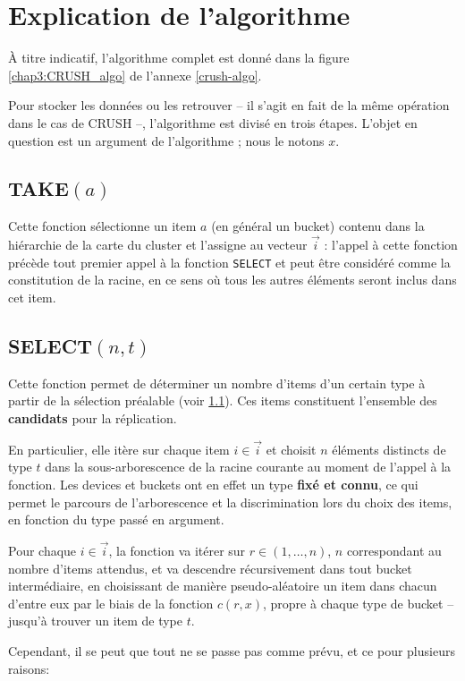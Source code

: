 \section{Explication de l'algorithme}

À titre indicatif, l'algorithme complet est donné dans la figure \ref{chap3:CRUSH_algo} de l'annexe \ref{crush-algo}.

Pour stocker les données ou les retrouver -- il s'agit en fait de la même opération dans le cas de CRUSH --, l'algorithme est divisé en trois étapes. L'objet en question est un argument de l'algorithme ; nous le notons $x$.

\subsection{TAKE$(a)$}\label{chap3:take}
Cette fonction sélectionne un item $a$ (en général un bucket) contenu dans la hiérarchie de la carte du cluster et l'assigne au vecteur $\vec{i}$ : l'appel à cette fonction précède tout premier appel à la fonction \verb|SELECT| et peut être considéré comme la constitution de la racine, en ce sens où tous les autres éléments seront inclus dans cet item.

\subsection{SELECT$(n,t)$}
Cette fonction permet de déterminer un nombre d'items d'un certain type à partir de la sélection préalable (voir \ref{chap3:take}). Ces items constituent l'ensemble des \textbf{candidats} pour la réplication.

En particulier, elle itère sur chaque item $i \in \vec{i}$ et choisit $n$ éléments distincts de type $t$ dans la sous-arborescence de la racine courante au moment de l'appel à la fonction. Les devices et buckets ont en effet un type \textbf{fixé et connu}, ce qui permet le parcours de l'arborescence et la discrimination lors du choix des items, en fonction du type passé en argument.

Pour chaque $i \in \vec{i}$, la fonction va itérer sur $r \in (1,\ldots,n)$, $n$ correspondant au nombre d'items attendus, et va descendre récursivement dans tout bucket intermédiaire, en choisissant de manière pseudo-aléatoire un item dans chacun d'entre eux par le biais de la fonction $c(r,x)$, propre à chaque type de bucket -- jusqu'à trouver un item de type $t$.

Cependant, il se peut que tout ne se passe pas comme prévu, et ce pour plusieurs raisons: 

